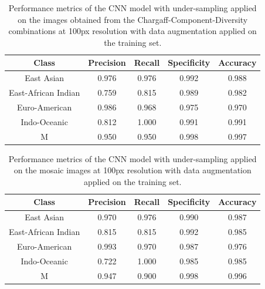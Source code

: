 \begin{table}[H]
	\centering
	\begin{tabular}{|c|c|c|c|c|}
		\hline
		\textbf{Class}      & \textbf{Precision} & \textbf{Recall} & \textbf{Specificity} & \textbf{Accuracy} \\
		\hline
		East Asian          & 0.976              & 0.976           & 0.992                & 0.988             \\
		East-African Indian & 0.759              & 0.815           & 0.989                & 0.982             \\
		Euro-American       & 0.986              & 0.968           & 0.975                & 0.970             \\
		Indo-Oceanic        & 0.812              & 1.000           & 0.991                & 0.991             \\
		M                   & 0.950              & 0.950           & 0.998                & 0.997             \\
		\hline
	\end{tabular}
	\caption{Performance metrics of the CNN model with under-sampling applied on the images obtained from the Chargaff-Component-Diversity
		combinations at 100px resolution with data augmentation applied on the training set.}
	\label{tab:augmentation_performance_metrics}
\end{table}

\begin{table}[H]
	\centering
	\begin{tabular}{|c|c|c|c|c|}
		\hline
		\textbf{Class}      & \textbf{Precision} & \textbf{Recall} & \textbf{Specificity} & \textbf{Accuracy} \\
		\hline
		East Asian          & 0.970              & 0.976           & 0.990                & 0.987             \\
		East-African Indian & 0.815              & 0.815           & 0.992                & 0.985             \\
		Euro-American       & 0.993              & 0.970           & 0.987                & 0.976             \\
		Indo-Oceanic        & 0.722              & 1.000           & 0.985                & 0.985             \\
		M                   & 0.947              & 0.900           & 0.998                & 0.996             \\
		\hline
	\end{tabular}
	\caption{Performance metrics of the CNN model with under-sampling applied on the mosaic images at 100px resolution with data augmentation
		applied on the training set.}
	\label{tab:augmentation_performance_metrics_mosaic}
\end{table}


